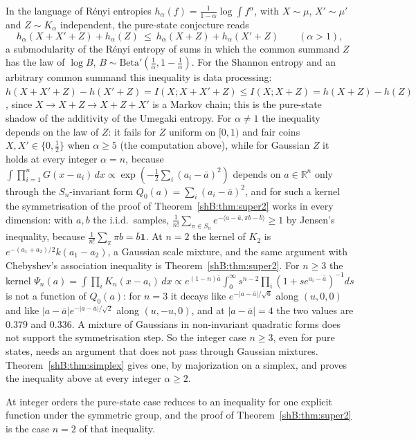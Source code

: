 \begin{remark}
In the language of R\'enyi entropies $h_\alpha(f)=\frac1{1-\alpha}\log\int f^\alpha$, with $X\sim\mu$, $X'\sim\mu'$ and $Z\sim K_\alpha$ independent, the pure-state conjecture reads
\[
h_\alpha(X+X'+Z)+h_\alpha(Z)\ \le\ h_\alpha(X+Z)+h_\alpha(X'+Z)\qquad(\alpha>1),
\]
a submodularity of the R\'enyi entropy of sums in which the common summand $Z$ has the law of $\log B$, $B\sim\mathrm{Beta}'(\frac1\alpha,1-\frac1\alpha)$. For the Shannon entropy and an arbitrary common summand this inequality is data processing: $h(X+X'+Z)-h(X'+Z)=I(X;X+X'+Z)\le I(X;X+Z)=h(X+Z)-h(Z)$, since $X\to X+Z\to X+Z+X'$ is a Markov chain; this is the pure-state shadow of the additivity of the Umegaki entropy. For $\alpha\ne1$ the inequality depends on the law of $Z$: it fails for $Z$ uniform on $[0,1)$ and fair coins $X,X'\in\{0,\frac12\}$ when $\alpha\ge5$ (the computation above), while for Gaussian $Z$ it holds at every integer $\alpha=n$, because $\int\prod_{i=1}^nG(x-a_i)\,dx\propto\exp(-\frac12\sum_i(a_i-\bar a)^2)$ depends on $a\in\mathbb R^n$ only through the $S_n$-invariant form $Q_0(a)=\sum_i(a_i-\bar a)^2$, and for such a kernel the symmetrisation of the proof of Theorem~\ref{shB:thm:super2} works in every dimension: with $a,b$ the i.i.d.\ samples, $\frac1{n!}\sum_{\pi\in S_n}e^{-\langle a-\bar a,\pi b-\bar b\rangle}\ge1$ by Jensen's inequality, because $\frac1{n!}\sum_\pi\pi b=\bar b\mathbf 1$. At $n=2$ the kernel of $K_2$ is $e^{-(a_1+a_2)/2}k(a_1-a_2)$, a Gaussian scale mixture, and the same argument with Chebyshev's association inequality is Theorem~\ref{shB:thm:super2}. For $n\ge3$ the kernel $\Psi_n(a)=\int\prod_iK_n(x-a_i)\,dx\propto e^{(1-n)\bar a}\int_0^\infty s^{n-2}\prod_i(1+se^{a_i-\bar a})^{-1}ds$ is not a function of $Q_0(a)$: for $n=3$ it decays like $e^{-|a-\bar a|/\sqrt6}$ along $(u,0,0)$ and like $|a-\bar a|e^{-|a-\bar a|/\sqrt2}$ along $(u,-u,0)$, and at $|a-\bar a|=4$ the two values are $0.379$ and $0.336$. A mixture of Gaussians in non-invariant quadratic forms does not support the symmetrisation step. So the integer case $n\ge3$, even for pure states, needs an argument that does not pass through Gaussian mixtures. Theorem~\ref{shB:thm:simplex} gives one, by majorization on a simplex, and proves the inequality above at every integer $\alpha\ge2$.
\end{remark}

At integer orders the pure-state case reduces to an inequality for one explicit function under the symmetric group, and the proof of Theorem~\ref{shB:thm:super2} is the case $n=2$ of that inequality.

